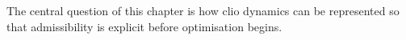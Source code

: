 The central question of this chapter is how clio dynamics can be represented so that admissibility is explicit before optimisation begins.
